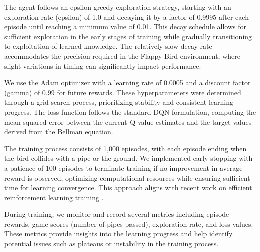 The agent follows an epsilon-greedy exploration strategy, starting with an exploration rate (epsilon) of 1.0 and decaying it by a factor of 0.9995 after each episode until reaching a minimum value of 0.01. This decay schedule allows for sufficient exploration in the early stages of training while gradually transitioning to exploitation of learned knowledge. The relatively slow decay rate accommodates the precision required in the Flappy Bird environment, where slight variations in timing can significantly impact performance.

We use the Adam optimizer with a learning rate of 0.0005 and a discount factor (gamma) of 0.99 for future rewards. These hyperparameters were determined through a grid search process, prioritizing stability and consistent learning progress. The loss function follows the standard DQN formulation, computing the mean squared error between the current Q-value estimates and the target values derived from the Bellman equation.

The training process consists of 1,000 episodes, with each episode ending when the bird collides with a pipe or the ground. We implemented early stopping with a patience of 100 episodes to terminate training if no improvement in average reward is observed, optimizing computational resources while ensuring sufficient time for learning convergence. This approach aligns with recent work on efficient reinforcement learning training \cite{schulman2023proximal}.

During training, we monitor and record several metrics including episode rewards, game scores (number of pipes passed), exploration rate, and loss values. These metrics provide insights into the learning progress and help identify potential issues such as plateaus or instability in the training process.